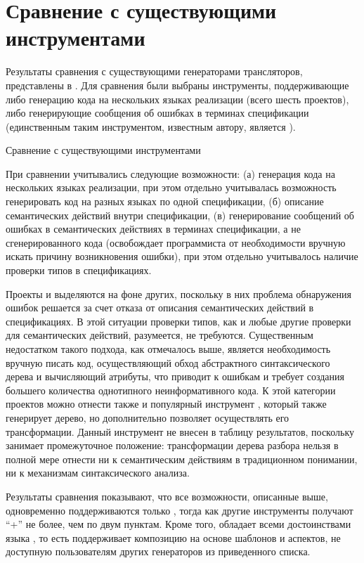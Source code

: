 \chapter{Сравнение с существующими инструментами}

Результаты сравнения \ATF{} с существующими генераторами трансляторов, представлены в . Для сравнения были выбраны инструменты, поддерживающие либо генерацию кода на нескольких языках реализации (всего шесть проектов), либо генерирующие сообщения об ошибках в терминах спецификации (единственным таким инструментом, известным автору, является ). 

\begin{table}[htbp]
	\centering
\newcommand{\dissonly}[1]{#1}
	
	\caption{Сравнение \ATF{} с существующими инструментами}\label{AtfTable}
\end{table}

При сравнении учитывались следующие возможности: 
	(а) генерация кода на нескольких языках реализации, при этом отдельно учитывалась возможность генерировать код на разных языках по одной спецификации,
	(б) описание семантических действий внутри спецификации,
	(в) генерирование сообщений об ошибках в семантических действиях в терминах спецификации, а не сгенерированного кода (освобождает программиста от необходимости вручную искать причину возникновения ошибки), при этом отдельно учитывалось наличие проверки типов в спецификациях.
	
Проекты  и  выделяются на фоне других, поскольку в них проблема обнаружения ошибок решается за счет отказа от описания семантических действий в спецификациях. В этой ситуации проверки типов, как и любые другие проверки для семантических действий, разумеется, не требуются. Существенным недостатком такого подхода, как отмечалось выше, является необходимость вручную писать код, осуществляющий обход абстрактного синтаксического дерева и вычисляющий атрибуты, что приводит к ошибкам и требует создания большего количества однотипного неинформативного кода. К этой категории проектов можно отнести также и популярный инструмент  \cite{???}, который также генерирует дерево, но дополнительно позволяет осуществлять его трансформации. Данный инструмент не внесен в таблицу результатов, поскольку занимает промежуточное положение: трансформации дерева разбора нельзя в полной мере отнести ни к семантическим действиям в традиционном понимании, ни к механизмам синтаксического анализа.
	
Результаты сравнения показывают, что все возможности, описанные выше, одновременно поддерживаются только \ATF{}, тогда как другие инструменты получают ``+'' не более, чем по двум пунктам. Кроме того, \ATF{} обладает всеми достоинствами языка \GRM{}, то есть поддерживает композицию на основе шаблонов и аспектов, не доступную пользователям других генераторов из приведенного списка.

